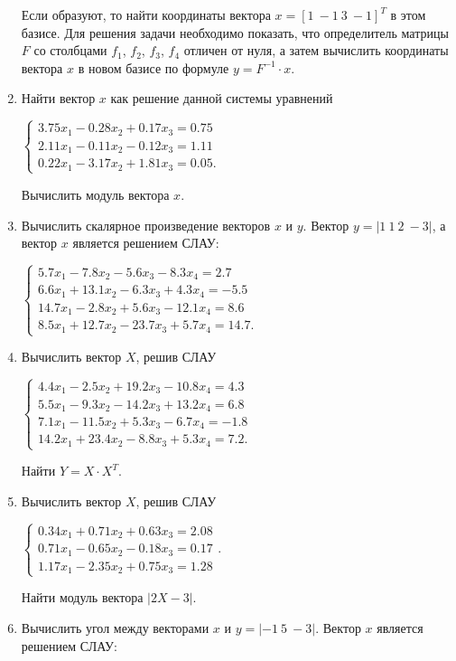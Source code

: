\begin{enumerate}
Если образуют, то найти координаты вектора  $x=[1\ -1\ 3\ -1]^T$  в этом базисе. Для решения задачи необходимо
показать, что определитель матрицы $F$ со столбцами $f_1$, $f_2$, $f_3$, $f_4$  
отличен от нуля, а затем вычислить координаты вектора $x$ в новом базисе по формуле 
$y=F^{-1}\cdot x$.
\item Найти вектор $x$ как решение данной системы уравнений

$\left\{\begin{matrix}
3.75x_1-0.28x_2+0.17x_3=0.75\\
2.11x_1-0.11x_2-0.12x_3=1.11\\
0.22x_1-3.17x_2+1.81x_3=0.05.
\end{matrix}\right.$

Вычислить модуль вектора $x$.
\item  Вычислить скалярное произведение векторов $x$ и $y$. Вектор  $y=|1\ 1\ 2\ -3|$, а вектор
$x$ является решением СЛАУ:

$\left\{\begin{matrix}
5.7x_1-7.8x_2-5.6x_3-8.3x_4=2.7\\
6.6x_1+13.1x_2-6.3x_3+4.3x_4=-5.5\\
14.7x_1-2.8x_2+5.6x_3-12.1x_4=8.6\\
8.5x_1+12.7x_2-23.7x_3+5.7x_4=14.7.
\end{matrix}\right.$
\item Вычислить вектор $X$, решив СЛАУ

$\left\{\begin{matrix}
4.4x_1-2.5x_2+19.2x_3-10.8x_4=4.3\\
5.5x_1-9.3x_2-14.2x_3+13.2x_4=6.8\\
7.1x_1-11.5x_2+5.3x_3-6.7x_4=-1.8\\
14.2x_1+23.4x_2-8.8x_3+5.3x_4=7.2.
\end{matrix}\right.$

Найти  $Y=X\cdot X^T$.
\item Вычислить вектор $X$, решив СЛАУ

$\left\{\begin{matrix}0.34x_1+0.71x_2+0.63x_3=2.08\\0.71x_1-0.65x_2-0.18x_3=0.17\\1.17x_1-2.35x_2+0.75x_3=1.28\end{matrix}\right.$. 

Найти модуль вектора $|2X-3|$.
\item Вычислить угол между векторами $x$ и  $y=|-1\ 5\ -3|$. Вектор $x$ является решением СЛАУ:


\end{enumerate}
